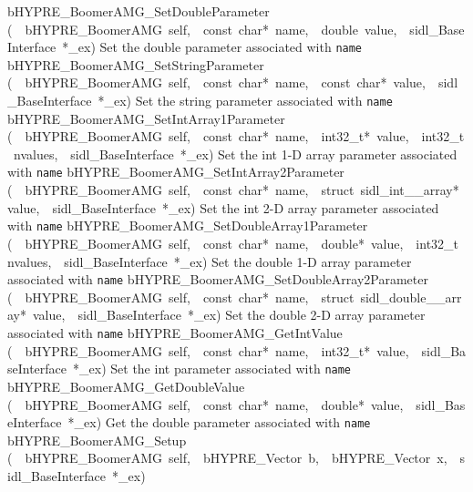 \documentclass{article}
\begin{document}
\begin{cxxentry}
\begin{cxxentry}
\begin{cxxnames}
        {bHYPRE\_BoomerAMG\_SetDoubleParameter}
        {(\ \ bHYPRE\_BoomerAMG\ self,\ \ const\ char*\ name,\ \ double\ value,\ \ sidl\_BaseInterface\ *\_ex)}
        {
Set the double parameter associated with {\tt name}}
        {}
\label{cxx.6.2.20}
        {bHYPRE\_BoomerAMG\_SetStringParameter}
        {(\ \ bHYPRE\_BoomerAMG\ self,\ \ const\ char*\ name,\ \ const\ char*\ value,\ \ sidl\_BaseInterface\ *\_ex)}
        {
Set the string parameter associated with {\tt name}}
        {}
\label{cxx.6.2.21}
        {bHYPRE\_BoomerAMG\_SetIntArray1Parameter}
        {(\ \ bHYPRE\_BoomerAMG\ self,\ \ const\ char*\ name,\ \ int32\_t*\ value,\ \ int32\_t\ nvalues,\ \ sidl\_BaseInterface\ *\_ex)}
        {
Set the int 1-D array parameter associated with {\tt name}}
        {}
\label{cxx.6.2.22}
        {bHYPRE\_BoomerAMG\_SetIntArray2Parameter}
        {(\ \ bHYPRE\_BoomerAMG\ self,\ \ const\ char*\ name,\ \ struct\ sidl\_int\_\_array*\ value,\ \ sidl\_BaseInterface\ *\_ex)}
        {
Set the int 2-D array parameter associated with {\tt name}}
        {}
\label{cxx.6.2.23}
        {bHYPRE\_BoomerAMG\_SetDoubleArray1Parameter}
        {(\ \ bHYPRE\_BoomerAMG\ self,\ \ const\ char*\ name,\ \ double*\ value,\ \ int32\_t\ nvalues,\ \ sidl\_BaseInterface\ *\_ex)}
        {
Set the double 1-D array parameter associated with {\tt name}}
        {}
\label{cxx.6.2.24}
        {bHYPRE\_BoomerAMG\_SetDoubleArray2Parameter}
        {(\ \ bHYPRE\_BoomerAMG\ self,\ \ const\ char*\ name,\ \ struct\ sidl\_double\_\_array*\ value,\ \ sidl\_BaseInterface\ *\_ex)}
        {
Set the double 2-D array parameter associated with {\tt name}}
        {}
\label{cxx.6.2.25}
        {bHYPRE\_BoomerAMG\_GetIntValue}
        {(\ \ bHYPRE\_BoomerAMG\ self,\ \ const\ char*\ name,\ \ int32\_t*\ value,\ \ sidl\_BaseInterface\ *\_ex)}
        {
Set the int parameter associated with {\tt name}}
        {}
\label{cxx.6.2.26}
        {bHYPRE\_BoomerAMG\_GetDoubleValue}
        {(\ \ bHYPRE\_BoomerAMG\ self,\ \ const\ char*\ name,\ \ double*\ value,\ \ sidl\_BaseInterface\ *\_ex)}
        {
Get the double parameter associated with {\tt name}}
        {}
\label{cxx.6.2.27}
        {bHYPRE\_BoomerAMG\_Setup}
        {(\ \ bHYPRE\_BoomerAMG\ self,\ \ bHYPRE\_Vector\ b,\ \ bHYPRE\_Vector\ x,\ \ sidl\_BaseInterface\ *\_ex)}

\end{cxxnames}
\end{cxxentry}
\end{cxxentry}
\end{document}
